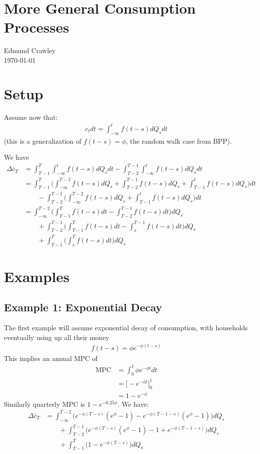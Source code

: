 \documentclass[12pt,pdftex,letterpaper]{article}
\begin{document}
\section{More General Consumption Processes}

Edmund Crawley\\
\today

\section{Setup}
Assume now that:
\begin{align*}
c_t dt = \int_{-\infty}^{t} f(t-s)dQ_s dt
\end{align*}
(this is a generalization of $f(t-s)=\phi$, the random walk case from BPP).

We have
\begin{align*}
\Delta \bar{c}_T &= \int_{T-1}^{T} \int_{-\infty}^{t} f(t-s) dQ_s dt - \int_{T-2}^{T-1} \int_{-\infty}^{t} f(t-s) dQ_s dt \\
&= \int_{T-1}^{T} \Big( \int_{-\infty}^{T-2} f(t-s)dQ_s + \int_{T-2}^{T-1} f(t-s)dQ_s + \int_{T-1}^{t} f(t-s)dQ_s \Big) dt \\
& \qquad -  \int_{T-2}^{T-1} \Big( \int_{-\infty}^{T-2} f(t-s)dQ_s  + \int_{T-1}^{t} f(t-s)dQ_s \Big) dt \\
&=  \int_{-\infty}^{T-2} \Big( \int_{T-1}^{T} f(t-s)dt -  \int_{T-2}^{T-1} f(t-s)dt  \Big) dQ_s \\
& \qquad +  \int_{T-2}^{T-1} \Big(\int_{T-1}^{T}f(t-s)dt - \int_{s}^{T-1}f(t-s)dt  \Big) dQ_s \\
& \qquad + \int_{T-1}^{T} \Big( \int_{s}^{T} f(t-s) dt \Big) dQ_s
\end{align*}

\section{Examples}
\subsection{Example 1: Exponential Decay}
The first example will assume exponential decay of consumption, with households eventually using up all their money
\begin{align*}
f(t-s) = \phi e^{-\phi(t-s)}
\end{align*}
This implies an annual MPC of
\begin{align*}
\text{MPC} &= \int_{0}^{1} \phi e^{-\phi t}dt \\
&= \Big[ -e^{-\phi t} \Big]^1_0 \\
&= 1-e^{-\phi} 
\end{align*}
Similarly quarterly MPC is $1-e^{-0.25\phi}$. We have:
\begin{align*}
\Delta \bar{c}_T &=   \int_{-\infty}^{T-2} \Big(e^{-\phi (T-s)}(e^{\phi}-1) -  e^{-\phi (T-1-s)}(e^{\phi}-1)  \Big) dQ_s \\
& \qquad +  \int_{T-2}^{T-1} \Big(e^{-\phi (T-s)}(e^{\phi}-1) - 1+ e^{-\phi (T-1-s)} \Big) dQ_s \\
& \qquad + \int_{T-1}^{T} \Big( 1-e^{-\phi (T-s)} \Big) dQ_s
\end{align*}
\end{document}
